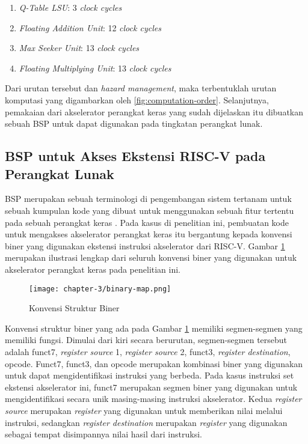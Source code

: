 \begin{enumerate}
	\item \textit{Q-Table \ac{LSU}}: 3 \textit{clock cycles}
	\item \textit{Floating Addition Unit}: 12 \textit{clock cycles}
	\item \textit{Max Seeker Unit}: 13 \textit{clock cycles}
	\item \textit{Floating Multiplying Unit}: 13 \textit{clock cycles}
\end{enumerate}

Dari urutan tersebut dan \textit{hazard management}, maka terbentuklah urutan komputasi yang digambarkan oleh \ref{fig:computation-order}. Selanjutnya, pemakaian dari akselerator perangkat keras yang sudah dijelaskan itu dibuatkan sebuah \ac{BSP} untuk dapat digunakan pada tingkatan perangkat lunak.

\subsection{\ac{BSP} untuk Akses Ekstensi RISC-V pada Perangkat Lunak}

\acf{BSP} merupakan sebuah terminologi di pengembangan sistem tertanam untuk sebuah kumpulan kode yang dibuat untuk menggunakan sebuah fitur tertentu pada sebuah perangkat keras \parencite{xin2021firmware}. Pada kasus di penelitian ini, pembuatan kode untuk mengakses akselerator perangkat keras itu bergantung kepada konvensi biner yang digunakan ekstensi instruksi akselerator dari RISC-V. Gambar \ref{fig:binary-map} merupakan ilustrasi lengkap dari seluruh konvensi biner yang digunakan untuk akselerator perangkat keras pada penelitian ini.

\begin{figure}[H]
	\centering
	\texttt{[image: chapter-3/binary-map.png]}
	\caption{Konvensi Struktur Biner}
	\label{fig:binary-map}
\end{figure}

Konvensi struktur biner yang ada pada Gambar \ref{fig:binary-map} memiliki segmen-segmen yang memiliki fungsi. Dimulai dari kiri secara berurutan, segmen-segmen tersebut adalah funct7, \textit{register source} 1, \textit{register source} 2, funct3, \textit{register destination}, opcode. Funct7, funct3, dan opcode merupakan kombinasi biner yang digunakan untuk dapat mengidentifikasi instruksi yang berbeda. Pada kasus instruksi set ekstensi akselerator ini, funct7 merupakan segmen biner yang digunakan untuk mengidentifikasi secara unik masing-masing instruksi akselerator. Kedua \textit{register source} merupakan \textit{register} yang digunakan untuk memberikan nilai melalui instruksi, sedangkan \textit{register destination} merupakan \textit{register} yang digunakan sebagai tempat disimpannya nilai hasil dari instruksi.

